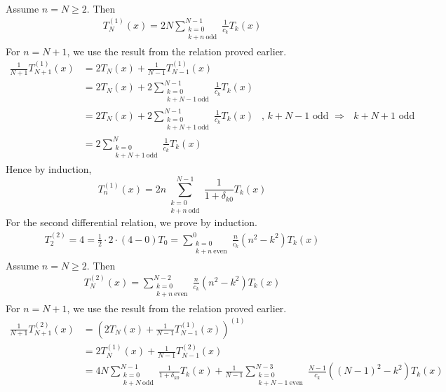 \documentclass[a4paper,8pt]{article}
\begin{document}
\begin{enumerate}[label=Q\arabic	*.]
\begin{align*}
\end{align*}
Assume $n = N \geq 2$. Then
\begin{align}
T^{(1)}_{N} (x) = 2N \sum\limits^{N-1}_{\substack{k = 0 \\ k + n \ \text{odd}}} \frac{1}{c_k} T_k(x) \nonumber
\end{align} 
For $n = N+1$, we use the result from the relation proved earlier.
\begin{align}
\frac{1}{N+1} T^{(1)}_{N+1} (x) &= 2 T_N(x) + \frac{1}{N-1} T^{(1)}_{N-1} (x) \nonumber \\
&= 2 T_N(x) + 2 \sum\limits^{N-1}_{\substack{k = 0 \\ k + N-1 \ \text{odd}}} \frac{1}{c_k} T_k(x) \nonumber \\
&= 2 T_N(x) + 2 \sum\limits^{N-1}_{\substack{k = 0 \\ k + N+1 \ \text{odd}}} \frac{1}{c_k} T_k(x) \ \ \text{\ \ , $k+N-1$ odd $\Rightarrow$ $k+N+1$ odd} \nonumber \\
&= 2 \sum\limits^{N}_{\substack{k = 0 \\ k + N+1 \ \text{odd}}} \frac{1}{c_k} T_k(x) \nonumber
\end{align}
Hence by induction,
\begin{equation}
T^{(1)}_{n} (x) = 2 n \sum\limits^{N-1}_{\substack{k = 0 \\ k + n \ \text{odd}}} \frac{1}{1 + \delta_{k0}} T_k(x) \nonumber
\end{equation}
\newpage
For the second differential relation, we prove by induction.
\begin{align*}
T^{(2)}_2 = 4 = \frac{1}{2} \cdot 2 \cdot (4-0) T_0 = \sum\limits^{0}_{\substack{k = 0 \\ k + n \ \text{even}}} \frac{n}{c_k} (n^2 - k^2) T_k(x) \nonumber
\end{align*}
Assume $n = N \geq 2$. Then
\begin{align}
T^{(2)}_{N} (x) = \sum\limits^{N-2}_{\substack{k = 0 \\ k + n \ \text{even}}} \frac{n}{c_k} (n^2 - k^2) T_k(x) \nonumber
\end{align}
For $n = N+1$, we use the result from the relation proved earlier.
\begin{align}
\frac{1}{N+1} T^{(2)}_{N+1} (x) &= \left(2 T_N(x) + \frac{1}{N-1} T^{(1)}_{N-1} (x)\right)^{(1)} \nonumber \\
&= 2 T^{(1)}_N(x) + \frac{1}{N-1} T^{(2)}_{N-1}(x) \nonumber \\
&= 4 N \sum\limits^{N-1}_{\substack{k = 0 \\ k + N \ \text{odd}}} \frac{1}{1 + \delta_{k0}} T_k(x) + \frac{1}{N-1} \sum\limits^{N-3}_{\substack{k = 0 \\ k + N - 1 \ \text{even}}} \frac{N-1}{c_k} ((N-1)^2 - k^2) T_k(x) \nonumber \\

\end{align}
\end{enumerate}
\end{document}
